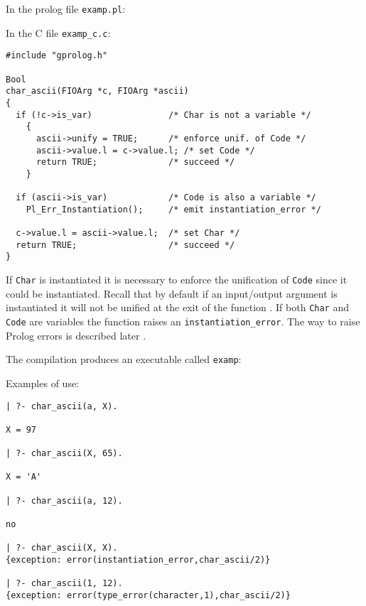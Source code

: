 In the prolog file \texttt{examp.pl}:


In the C file \texttt{examp\_c.c}:

\begin{Indentation}
\begin{verbatim}
#include "gprolog.h"

Bool
char_ascii(FIOArg *c, FIOArg *ascii)
{
  if (!c->is_var)               /* Char is not a variable */
    {
      ascii->unify = TRUE;      /* enforce unif. of Code */
      ascii->value.l = c->value.l; /* set Code */
      return TRUE;              /* succeed */
    }

  if (ascii->is_var)            /* Code is also a variable */
    Pl_Err_Instantiation();     /* emit instantiation_error */

  c->value.l = ascii->value.l;  /* set Char */
  return TRUE;                  /* succeed */
}
\end{verbatim}
\end{Indentation}

If \texttt{Char} is instantiated it is necessary to enforce the unification
of \texttt{Code} since it could be instantiated. Recall that by default if
an input/output argument is instantiated it will not be unified at the exit
of the function . If both \texttt{Char} and
\texttt{Code} are variables the function raises an
\texttt{instantiation\_error}. The way to raise Prolog errors is described
later .

The compilation produces an executable called \texttt{examp}:


Examples of use:

\begin{Indentation}
\begin{verbatim}
| ?- char_ascii(a, X).

X = 97

| ?- char_ascii(X, 65).

X = 'A'

| ?- char_ascii(a, 12).

no

| ?- char_ascii(X, X).
{exception: error(instantiation_error,char_ascii/2)}

| ?- char_ascii(1, 12).
{exception: error(type_error(character,1),char_ascii/2)}
\end{verbatim}
\end{Indentation}

